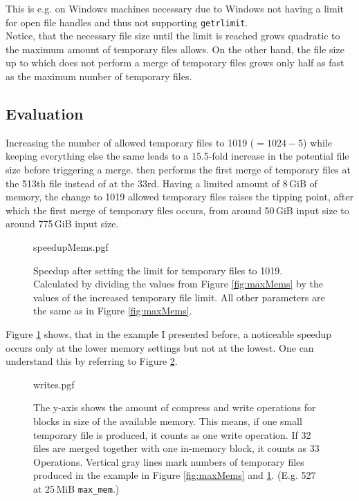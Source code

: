 This is e.g. on Windows machines necessary due to Windows not having a limit for open file handles and thus not supporting \texttt{getrlimit}. \\
Notice, that the necessary file size until the limit is reached grows quadratic to the maximum amount of temporary files \sort allows. On the other hand, the file size up to which \sort does not perform a merge of temporary files grows only half as fast as the maximum number of temporary files.

\subsection{Evaluation}
Increasing the number of allowed temporary files to 1019 ($=1024-5$) while keeping everything else the same leads to a 15.5-fold increase in the potential file size before triggering a merge. \sort then performs the first merge of temporary files at the 513th file instead of at the 33rd. Having a limited amount of 8\,GiB of memory, the change to 1019 allowed temporary files raises the tipping point, after which the first merge of temporary files occurs, from around 50\,GiB input size to around 775\,GiB input size.
\begin{figure}
        {speedupMems.pgf}
    \caption{Speedup after setting the limit for temporary files to 1019. Calculated by dividing the values from Figure \ref{fig:maxMems} by the values of the increased temporary file limit. All other parameters are the same as in Figure \ref{fig:maxMems}.}
    \label{fig:memSpeedup}
\end{figure}
Figure \ref{fig:memSpeedup} shows, that in the example I presented before, a noticeable speedup occurs only at the lower memory settings but not at the lowest. One can understand this by referring to Figure \ref{fig:writes}.
\begin{figure}
        {writes.pgf}
    \caption{
    The y-axis shows the amount of compress and write operations for blocks in size of the available memory. This means, if one small temporary file is produced, it counts as one write operation. If 32 files are merged together with one in-memory block, it counts as 33 Operations. Vertical gray lines mark numbers of temporary files produced in the example in Figure \ref{fig:maxMems} and \ref{fig:memSpeedup}. (E.g. 527 at 25\,MiB \texttt{max\_mem}.)
    }
    \label{fig:writes}
\end{figure}
